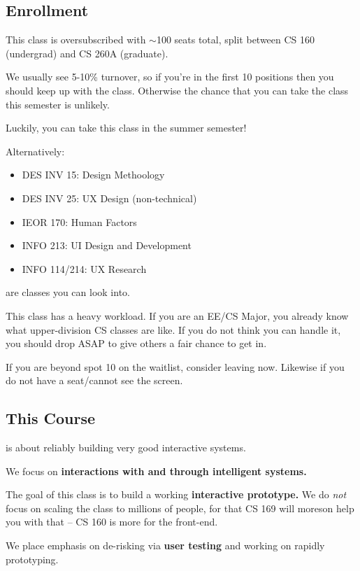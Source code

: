 \subsection{Enrollment}
This class is oversubscribed with $\sim$100 seats total, split between CS 160 (undergrad) and CS 260A (graduate).

We usually see 5-10\% turnover, so if you're in the first 10 positions then you should keep up with the class. Otherwise the chance that you can take the class this semester is unlikely.

Luckily, you can take this class in the summer semester!

Alternatively:
\begin{itemize}
    \item DES INV 15: Design Methoology
    \item DES INV 25: UX Design (non-technical)
    \item IEOR 170: Human Factors
    \item INFO 213: UI Design and Development
    \item INFO 114/214: UX Research
\end{itemize}
are classes you can look into.

\begin{important}
This class has a heavy workload. If you are an EE/CS Major, you already know what upper-division CS classes are like. If you do not think you can handle it, you should drop ASAP to give others a fair chance to get in.

If you are beyond spot 10 on the waitlist, consider leaving now. Likewise if you do not have a seat/cannot see the screen.
\end{important}

\subsection{This Course}
is about reliably building very good interactive systems.

We focus on \textbf{interactions with and 
through intelligent systems.}

The goal of this class is to build a working \textbf{interactive 
prototype.} We do \textit{not} focus on scaling the class to millions of people, for that CS 169 will moreson help you with that -- CS 160 is more for the front-end.

We place emphasis on de-risking via \textbf{user testing} and working on rapidly prototyping.

